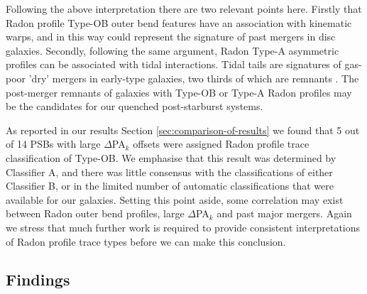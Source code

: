 Following the above interpretation there are two relevant points here. Firstly that Radon profile Type-OB outer bend features have an association with kinematic warps, and in this way could represent the signature of past mergers in disc galaxies. Secondly, following the same argument, Radon Type-A asymmetric profiles can be associated with tidal interactions. Tidal tails are signatures of gas-poor 'dry' mergers in early-type galaxies, two thirds of which are remnants \citep{2005AJ....130.2647V}. The post-merger remnants of galaxies with Type-OB or Type-A Radon profiles may be the candidates for our quenched post-starburst systems.

As reported in our results Section \ref{sec:comparison-of-results} we found that 5 out of 14 PSBs with large $\Delta$PA$_{k}$ offsets were assigned Radon profile trace classification of Type-OB. We emphasise that this result was determined by Classifier A, and there was little consensus with the classifications of either Classifier B, or in the limited number of automatic classifications that were available for our galaxies. Setting this point aside, some correlation may exist between Radon outer bend profiles, large $\Delta$PA$_{k}$ and past major mergers. Again we stress that much further work is required to provide consistent interpretations of Radon profile trace types before we can make this conclusion.

\subsection{Findings}
\label{findings}


